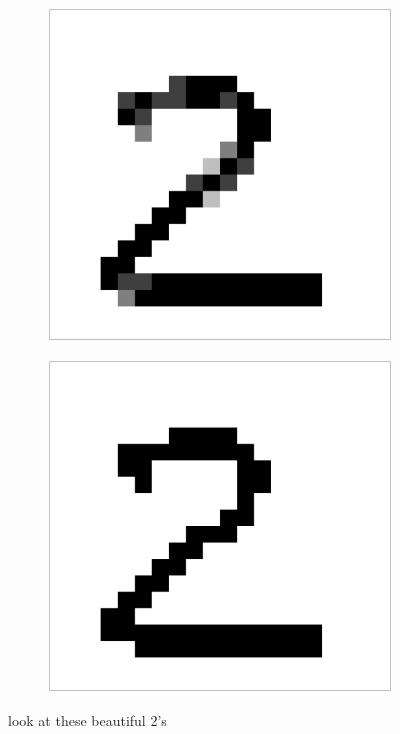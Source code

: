 \begin{figure}[h]
\begin{subfigure}{0.2\textwidth}
    \end{subfigure}
    \begin{subfigure}{0.2\textwidth}
        \includegraphics[width = \textwidth]{graphics/bins_5}
    \end{subfigure}
    \begin{subfigure}{0.2\textwidth}
        \includegraphics[width = \textwidth]{graphics/bins_2}
    \end{subfigure}
\caption{look at these beautiful 2's}
\end{figure}